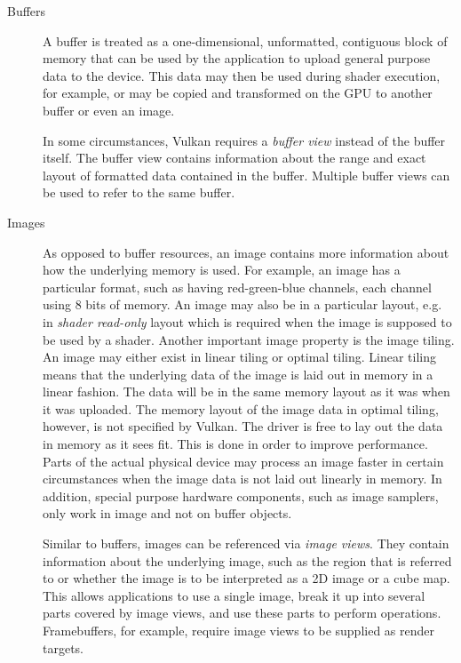    \begin{description}
      \item[Buffers]
        A buffer is treated as a one-dimensional, unformatted, contiguous block of memory that can be used by the \gls{application} to upload general purpose data to the device. This data may then be used during shader execution, for example, or may be copied and transformed on the GPU to another buffer or even an image.

        In some circumstances, Vulkan requires a \textit{buffer view} instead of the buffer itself.
        The buffer view contains information about the range and exact layout of formatted data contained in the buffer.
        Multiple buffer views can be used to refer to the same buffer.

      \item[Images]
        As opposed to buffer resources, an image contains more information about how the underlying memory is used. For example, an image has a particular format, such as having red-green-blue channels, each channel using 8 bits of memory. An image may also be in a particular layout, e.g. in \textit{shader read-only} layout which is required when the image is supposed to be used by a shader. Another important image property is the image tiling. An image may either exist in linear tiling or optimal tiling. Linear tiling means that the underlying data of the image is laid out in memory in a linear fashion. The data will be in the same memory layout as it was when it was uploaded. The memory layout of the image data in optimal tiling, however, is not specified by Vulkan. The \gls{driver} is free to lay out the data in memory as it sees fit. This is done in order to improve performance. Parts of the actual physical device may process an image faster in certain circumstances when the image data is not laid out linearly in memory. In addition, special purpose hardware components, such as image samplers, only work in image and not on buffer objects.

        Similar to buffers, images can be referenced via \textit{image views}.
        They contain information about the underlying image, such as the region that is referred to or whether the image is to be interpreted as a 2D image or a cube map.
        This allows applications to use a single image, break it up into several parts covered by image views, and use these parts to perform operations.
        Framebuffers, for example, require image views to be supplied as render targets.
    \end{description}


